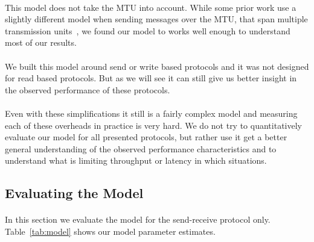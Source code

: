 \paragraph{} This model does not take the MTU into account. While some prior work use a slightly different model when sending 
messages over the MTU, that span multiple transmission units~\cite{dare}, we found our model to works well enough to understand
most of our results.

\paragraph{} We built this model around send or write based protocols and it was not designed 
for read based protocols. But as we will see it can still give us better insight in the observed performance of these 
protocols.

\paragraph{} Even with these simplifications it still is a fairly complex model and measuring each of these overheads in 
practice is very hard. We do not try to quantitatively evaluate our model for all presented protocols, but rather use it 
get a better general understanding of the observed performance characteristics and to understand what is limiting throughput
or latency in which situations.

\pagebreak
\subsection{Evaluating the Model}

\paragraph{} In this section we evaluate the model for the send-receive protocol only. Table~\ref{tab:model} shows our model
parameter estimates. 

